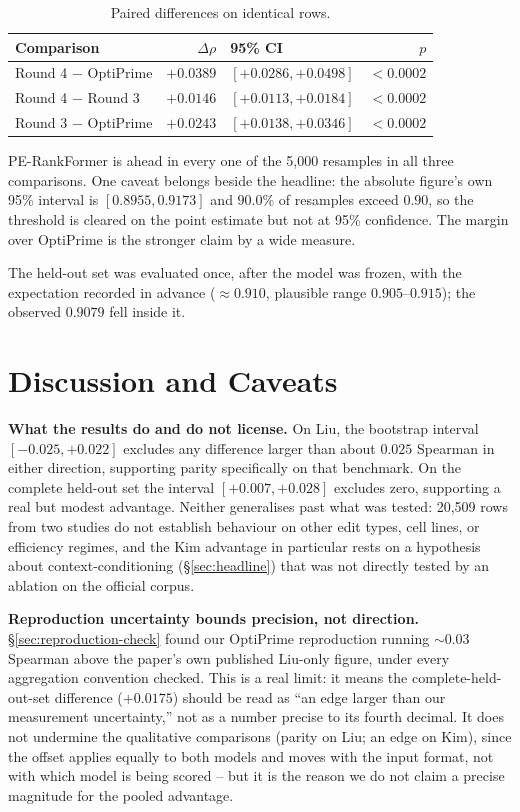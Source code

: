 \documentclass[11pt]{article}
\begin{document}
\begin{table}[H]
\centering
\caption{Paired differences on identical rows.}
\label{tab:final-boot}
\begin{tabular}{lrlr}
\toprule
Comparison & $\Delta\rho$ & 95\% CI & $p$ \\
\midrule
Round 4 $-$ OptiPrime & $+0.0389$ & $[+0.0286, +0.0498]$ & $<0.0002$ \\
Round 4 $-$ Round 3 & $+0.0146$ & $[+0.0113, +0.0184]$ & $<0.0002$ \\
Round 3 $-$ OptiPrime & $+0.0243$ & $[+0.0138, +0.0346]$ & $<0.0002$ \\
\bottomrule
\end{tabular}
\end{table}

PE-RankFormer is ahead in every one of the 5{,}000 resamples in all three
comparisons. One caveat belongs beside the headline: the absolute figure's own
95\% interval is $[0.8955, 0.9173]$ and $90.0\%$ of resamples exceed $0.90$, so
the threshold is cleared on the point estimate but not at 95\% confidence. The
margin over OptiPrime is the stronger claim by a wide measure.

The held-out set was evaluated once, after the model was frozen, with the
expectation recorded in advance ($\approx 0.910$, plausible range
$0.905$--$0.915$); the observed $0.9079$ fell inside it.

\section{Discussion and Caveats}
\label{sec:caveats}

\textbf{What the results do and do not license.} On Liu, the bootstrap interval
$[-0.025, +0.022]$ excludes any difference larger than about $0.025$ Spearman in
either direction, supporting parity specifically on that benchmark. On the complete
held-out set the interval $[+0.007, +0.028]$ excludes zero, supporting a real but
modest advantage. Neither generalises past what was tested: 20{,}509 rows from two
studies do not establish behaviour on other edit types, cell lines, or efficiency
regimes, and the Kim advantage in particular rests on a hypothesis about
context-conditioning (\S\ref{sec:headline}) that was not directly tested by an
ablation on the official corpus.

\textbf{Reproduction uncertainty bounds precision, not direction.} \S\ref{sec:reproduction-check}
found our OptiPrime reproduction running $\sim$0.03 Spearman above the paper's own
published Liu-only figure, under every aggregation convention checked. This is a
real limit: it means the complete-held-out-set difference ($+0.0175$) should be read
as ``an edge larger than our measurement uncertainty,'' not as a number precise to
its fourth decimal. It does not undermine the qualitative comparisons (parity on Liu;
an edge on Kim), since the offset applies equally to both models and moves with the
input format, not with which model is being scored -- but it is the reason we do not
claim a precise magnitude for the pooled advantage.
\end{document}
